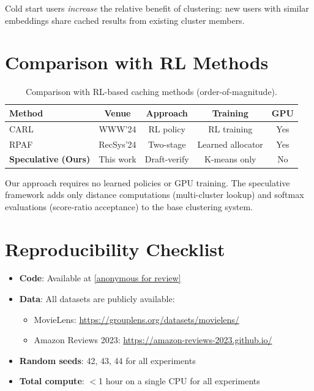 \documentclass{article}
\begin{document}
Cold start users \emph{increase} the relative benefit of clustering: new users with similar embeddings share cached results from existing cluster members.

\section{Comparison with RL Methods}
\label{app:rl_comparison}

\begin{table}[h]
\centering
\caption{Comparison with RL-based caching methods (order-of-magnitude).}
\label{tab:rl_compare}
\small
\begin{tabular}{lcccc}
\toprule
\textbf{Method} & \textbf{Venue} & \textbf{Approach} & \textbf{Training} & \textbf{GPU} \\
\midrule
CARL & WWW'24 & RL policy & RL training & Yes \\
RPAF & RecSys'24 & Two-stage & Learned allocator & Yes \\
\textbf{Speculative (Ours)} & This work & Draft-verify & K-means only & No \\
\bottomrule
\end{tabular}
\end{table}

Our approach requires no learned policies or GPU training. The speculative framework adds only distance computations (multi-cluster lookup) and softmax evaluations (score-ratio acceptance) to the base clustering system.

\section{Reproducibility Checklist}
\label{app:reproducibility}

\begin{itemize}
    \item \textbf{Code}: Available at \url{[anonymous for review]}
    \item \textbf{Data}: All datasets are publicly available:
    \begin{itemize}
        \item MovieLens: \url{https://grouplens.org/datasets/movielens/}
        \item Amazon Reviews 2023: \url{https://amazon-reviews-2023.github.io/}
    \end{itemize}
    \item \textbf{Random seeds}: 42, 43, 44 for all experiments
    \item \textbf{Total compute}: $<$1 hour on a single CPU for all experiments
\end{itemize}
\end{document}
